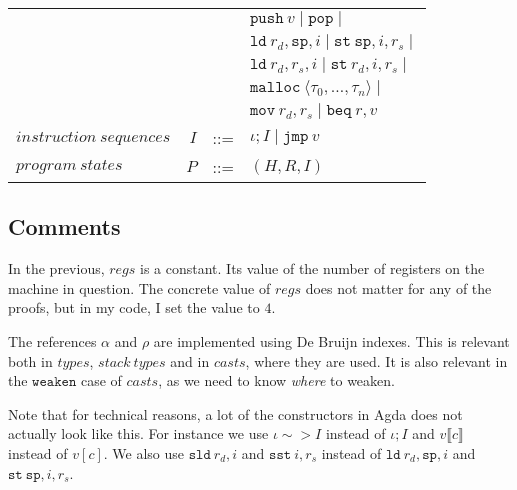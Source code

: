 \begin{tabular}{lrcl}
        &&& $\mathtt{push}\ v \mid \mathtt{pop} \mid$ \\
        &&& $\mathtt{ld}\ r_d, \mathtt{sp}, i \mid \mathtt{st}\ \mathtt{sp}, i, r_s \mid$\\
        &&& $\mathtt{ld}\ r_d, r_s, i \mid \mathtt{st}\ r_d, i, r_s \mid$\\
        &&& $\mathtt{malloc}\ \langle \tau_0, \dots, \tau_n \rangle \mid $ \\
        &&& $\mathtt{mov}\ r_d, r_s \mid \mathtt{beq}\ r, v$ \\
$instruction\ sequences$ & $I$ & ::= & $\iota ; I \mid \mathtt{jmp}\ v$ \\
$program\ states$ & $P$ & ::= & $(H, R, I)$ \\
\end{tabular}

\subsection{Comments}
In the previous, $regs$ is a constant. Its value of the number of registers on
the machine in question. The concrete value of $regs$ does not matter for any of
the proofs, but in my code, I set the value to $4$.

The references $\alpha$ and $\rho$ are implemented using De Bruijn indexes. This
is relevant both in $types$, $stack\ types$ and in $casts$, where they are
used. It is also relevant in the $\mathtt{weaken}$ case of $casts$, as we need
to know \emph{where} to weaken.

Note that for technical reasons, a lot of the constructors in Agda does not
actually look like this. For instance we use $\iota \sim> I$ instead of
$\iota ; I$ and $v \llbracket c \rrbracket$ instead of $v [ c ]$. We also use
$\mathtt{sld}\ r_d, i$ and $\mathtt{sst}\ i, r_s$ instead of
$\mathtt{ld}\ r_d, \mathtt{sp}, i$ and $\mathtt{st}\ \mathtt{sp}, i, r_s$.


